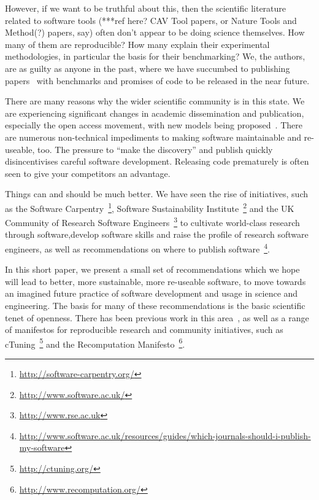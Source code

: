 \documentclass[conference]{IEEEtran}
\begin{document}
However, if we want to be truthful about this, then the scientific
literature related to software tools (***ref here? CAV Tool papers, or
Nature Tools and Method(?)  papers, say) often don't appear to be
doing science themselves. How many of them are reproducible? How many
explain their experimental methodologies, in particular the basis for
their benchmarking? We, the authors, are as guilty as anyone in the
past, where we have succumbed to publishing
papers~\cite{crick-et-al:2009, Berdine2011SLAyer} with benchmarks and
promises of code to be released in the near future.

There are many reasons why the wider scientific community is in this
state. We are experiencing significant changes in academic
dissemination and publication, especially the open access movement,
with new models being
proposed~\cite{stodden-et-al:2013,fursin+dubach:2014}.  There are
numerous non-technical impediments to making software maintainable and
re-useable, too. The pressure to ``make the discovery'' and publish
quickly disincentivises careful software development. Releasing
code prematurely is often seen to give your competitors an advantage.

Things can and should be much better. We have seen the rise of
initiatives, such as the Software
Carpentry~\footnote{\url{http://software-carpentry.org/}}, Software
Sustainability Institute~\footnote{\url{http://www.software.ac.uk/}}
and the UK Community of Research Software
Engineers~\footnote{\url{http://www.rse.ac.uk}} to cultivate
world-class research through software,develop software
skills and raise the profile of research software engineers, as well
as recommendations on where to publish
software~\footnote{\url{http://www.software.ac.uk/resources/guides/which-journals-should-i-publish-my-software}}.

In this short paper, we present a small set of recommendations which
we hope will lead to better, more sustainable, more re-useable
software, to move towards an imagined future practice of software
development and usage in science and engineering.  The basis for many
of these recommendations is the basic scientific tenet of openness.
There has been previous work in this
area~\cite{sim-et-al:2003,chirigati-et-al:2013}, as well as a range of
manifestos for reproducible research and community initiatives, such
as cTuning~\footnote{\url{http://ctuning.org/}} and the Recomputation
Manifesto~\footnote{\url{http://www.recomputation.org/}}.
\end{document}
